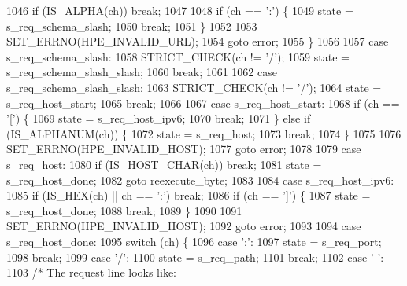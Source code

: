 \begin{DoxyCode}
1046         \textcolor{keywordflow}{if} (IS_ALPHA(ch)) \textcolor{keywordflow}{break};
1047 
1048         \textcolor{keywordflow}{if} (ch == \textcolor{charliteral}{':'}) \{
1049           state = s_req_schema_slash;
1050           \textcolor{keywordflow}{break};
1051         \}
1052 
1053         SET_ERRNO(HPE_INVALID_URL);
1054         \textcolor{keywordflow}{goto} error;
1055       \}
1056 
1057       \textcolor{keywordflow}{case} s_req_schema_slash:
1058         STRICT_CHECK(ch != \textcolor{charliteral}{'/'});
1059         state = s_req_schema_slash_slash;
1060         \textcolor{keywordflow}{break};
1061 
1062       \textcolor{keywordflow}{case} s_req_schema_slash_slash:
1063         STRICT_CHECK(ch != \textcolor{charliteral}{'/'});
1064         state = s_req_host_start;
1065         \textcolor{keywordflow}{break};
1066 
1067       \textcolor{keywordflow}{case} s_req_host_start:
1068         \textcolor{keywordflow}{if} (ch == \textcolor{charliteral}{'['}) \{
1069           state = s_req_host_ipv6;
1070           \textcolor{keywordflow}{break};
1071         \} \textcolor{keywordflow}{else} \textcolor{keywordflow}{if} (IS_ALPHANUM(ch)) \{
1072           state = s_req_host;
1073           \textcolor{keywordflow}{break};
1074         \}
1075 
1076         SET_ERRNO(HPE_INVALID_HOST);
1077         \textcolor{keywordflow}{goto} error;
1078 
1079       \textcolor{keywordflow}{case} s_req_host:
1080         \textcolor{keywordflow}{if} (IS_HOST_CHAR(ch)) \textcolor{keywordflow}{break};
1081         state = s_req_host_done;
1082         \textcolor{keywordflow}{goto} reexecute\_byte;
1083 
1084       \textcolor{keywordflow}{case} s_req_host_ipv6:
1085         \textcolor{keywordflow}{if} (IS_HEX(ch) || ch == \textcolor{charliteral}{':'}) \textcolor{keywordflow}{break};
1086         \textcolor{keywordflow}{if} (ch == \textcolor{charliteral}{']'}) \{
1087           state = s_req_host_done;
1088           \textcolor{keywordflow}{break};
1089         \}
1090 
1091         SET_ERRNO(HPE_INVALID_HOST);
1092         \textcolor{keywordflow}{goto} error;
1093 
1094       \textcolor{keywordflow}{case} s_req_host_done:
1095         \textcolor{keywordflow}{switch} (ch) \{
1096           \textcolor{keywordflow}{case} \textcolor{charliteral}{':'}:
1097             state = s_req_port;
1098             \textcolor{keywordflow}{break};
1099           \textcolor{keywordflow}{case} \textcolor{charliteral}{'/'}:
1100             state = s_req_path;
1101             \textcolor{keywordflow}{break};
1102           \textcolor{keywordflow}{case} \textcolor{charliteral}{' '}:
1103             \textcolor{comment}{/* The request line looks like:}

\end{DoxyCode}
